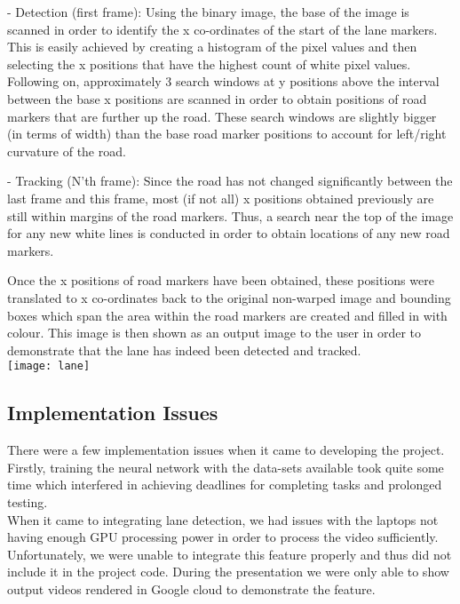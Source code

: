 \documentclass[conference]{IEEEtran}
\begin{document}
- Detection (first frame): Using the binary image, the base of the image is scanned in order to identify the x co-ordinates of the start of the lane markers. This is easily achieved by creating a histogram of the pixel values and then selecting the x positions that have the highest count of white pixel values. Following on, approximately 3 search windows at y positions above the interval between the base x positions are scanned in order to obtain positions of road markers that are further up the road. These search windows are slightly bigger (in terms of width) than the base road marker positions to account for left/right curvature of the road. 

- Tracking (N'th frame):
Since the road has not changed significantly between the last frame and this frame, most (if not all) x positions obtained previously are still within margins of the road markers. Thus, a search near the top of the image for any new white lines is conducted in order to obtain locations of any new road markers.

Once the x positions of road markers have been obtained, these positions were translated to x co-ordinates back to the original non-warped image and bounding boxes which span the area within the road markers are created and filled in with colour. This image is then shown as an output image to the user in order to demonstrate that the lane has indeed been detected and tracked.
\\

\texttt{[image: lane]}

\subsection{Implementation Issues}
There were a few implementation issues when it came to developing the project. Firstly, training the neural network with the data-sets available took quite some time which interfered in achieving deadlines for completing tasks and prolonged testing. \\

When it came to integrating lane detection, we had issues with the laptops not having enough GPU processing power in order to process the video sufficiently. Unfortunately, we were unable to integrate this feature properly and thus did not include it in the project code. During the presentation we were only able to show output videos rendered in Google cloud to demonstrate the feature. \\
\end{document}

